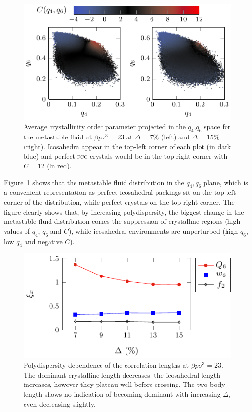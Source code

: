 \documentclass[twocolumn,superscriptaddress]{revtex4}
\begin{document}
\begin{figure}
 \centering
 \includegraphics{fig_Cmaps}
 \caption{Average crystallinity order parameter projected in the $q_4$,$q_6$ space for the metastable fluid at $\beta p\sigma^3=23$ at $\Delta=7\%$ (left) and $\Delta=15\%$ (right). Icosahedra appear in the top-left corner of each plot (in dark blue) and perfect \textsc{fcc} crystals would be in the top-right corner with $C=12$ (in red).}
 \label{fig:Cmaps}
\end{figure}


Figure~\ref{fig:Cmaps} shows that the metastable fluid distribution in the $q_4,q_6$ plane, which is a convenient
representation as perfect icosahedral packings sit on the top-left corner of the distribution, while perfect crystals on
the top-right corner. The figure clearly shows that, by increasing polydispersity, the biggest change in the metastable fluid
distribution comes the suppression of crystalline regions (high values of
$q_4$, $q_6$ and $C$), while icosahedral environments are unperturbed (high $q_6$, low $q_4$ and negative $C$).



\begin{figure}
 \centering
 \includegraphics{fig_lengthpoly}
	\caption{Polydispersity dependence of the correlation lengths at $\beta p\sigma^3=23$. The dominant crystalline length decreases, the icosahedral length increases, however they plateau well before crossing. The two-body length shows no indication of becoming dominant with increasing $\Delta$, even decreasing slightly.}
	\label{fig:lengthpoly}
\end{figure}
\end{document}
